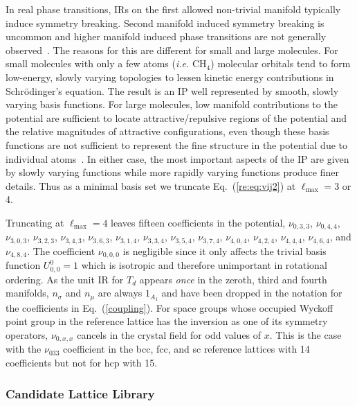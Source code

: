\documentclass[preprint]{iucr}              %
\begin{document}
In real phase transitions, IRs on the first allowed non-trivial manifold
typically induce symmetry breaking. Second manifold induced symmetry
breaking is uncommon and higher manifold induced phase transitions
are not generally observed~\cite{LyndenBell94}. The reasons for this
are different for small and large molecules. For small molecules
with only a few atoms (\emph{i.e.} CH$_4$) molecular orbitals tend
to form low-energy, slowly varying topologies to lessen kinetic
energy contributions in Schr\"{o}dinger's equation. The result is an
IP well represented by smooth, slowly varying basis functions. For
large molecules, low manifold contributions to the potential are
sufficient to locate attractive/repulsive regions of the potential
and the relative magnitudes of attractive configurations, even
though these basis functions are not sufficient to represent the
fine structure in the potential due to individual
atoms~\cite{Hloucha01}. In either case, the most important aspects
of the IP are given by slowly varying functions  while more rapidly
varying functions produce finer details. Thus as a minimal basis set
we truncate Eq.~(\ref{re:eq:vij2}) at $\ell_{\mathrm{max}}=3$ or 4.

Truncating at $\ell_\mathrm{max}=4$ leaves fifteen coefficients in
the potential, $\nu_{0,3,3}$, $\nu_{0,4,4}$, $\nu_{3,0,3}$,
$\nu_{3,2,3}$, $\nu_{3,4,3}$, $\nu_{3,6,3}$, $\nu_{3,1,4}$,
$\nu_{3,3,4}$, $\nu_{3,5,4}$, $\nu_{3,7,4}$, $\nu_{4,0,4}$,
$\nu_{4,2,4}$, $\nu_{4,4,4}$, $\nu_{4,6,4}$, and $\nu_{4,8,4}$. The
coefficient $\nu_{0,0,0}$ is negligible since it only affects the
trivial basis function $U_{0,0}^0=1$ which is isotropic and
therefore unimportant in rotational ordering.  As the unit IR for
$T_d$ appears \emph{once} in the zeroth, third and fourth manifolds,
$n_\sigma$ and $n_\mu$ are always $1_{A_1}$ and have been dropped in
the notation for the coefficients in Eq.~(\ref{coupling}). For space
groups whose occupied Wyckoff point group in the reference lattice
has the inversion as one of its symmetry operators, $\nu_{0,x,x}$
cancels in the crystal field for odd values of $x$. This is the case
with the $\nu_{033}$ coefficient in the bcc, fcc, and sc reference
lattices with 14 coefficients but not for hcp with
15.

\subsubsection{Candidate Lattice Library}
\label{collection}
\end{document}
